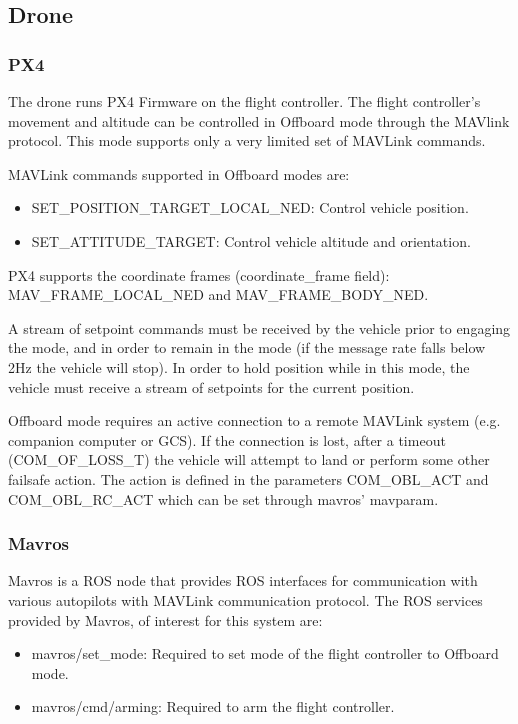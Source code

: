 \subsection{Drone}

\subsubsection{PX4}
The drone runs PX4 Firmware on the flight controller. The flight controller's movement and altitude can be controlled in Offboard mode through the MAVlink protocol. This mode supports only a very limited set of MAVLink commands.

MAVLink commands supported in Offboard modes are:
\begin{itemize}
  \item SET\_POSITION\_TARGET\_LOCAL\_NED: Control vehicle position.
  \item SET\_ATTITUDE\_TARGET: Control vehicle altitude and orientation.
\end{itemize}

PX4 supports the coordinate frames (coordinate\_frame field): MAV\_FRAME\_LOCAL\_NED and MAV\_FRAME\_BODY\_NED.

A stream of setpoint commands must be received by the vehicle prior to engaging the mode, and in order to remain in the mode (if the message rate falls below 2Hz the vehicle will stop). In order to hold position while in this mode, the vehicle must receive a stream of setpoints for the current position.

Offboard mode requires an active connection to a remote MAVLink system (e.g. companion computer or GCS). If the connection is lost, after a timeout (COM\_OF\_LOSS\_T) the vehicle will attempt to land or perform some other failsafe action. The action is defined in the parameters COM\_OBL\_ACT and COM\_OBL\_RC\_ACT which can be set through mavros' mavparam.

\subsubsection{Mavros}

Mavros is a ROS node that provides ROS interfaces for communication with various autopilots with MAVLink communication protocol.
The ROS services provided by Mavros,  of interest for this system are:
\begin{itemize}
  \item mavros/set\_mode: Required to set mode of the flight controller to Offboard mode.
  \item mavros/cmd/arming: Required to arm the flight controller.
\end{itemize}

